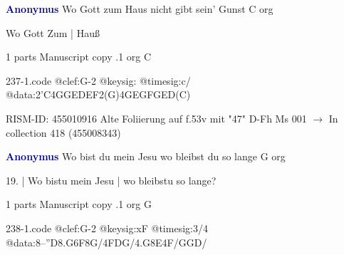 \documentclass[twocolumn]{book}
\begin{document}
\newline \par \vspace{7pt} \textcolor{darkblue}{\textbf{Anonymus  }}
\newline Wo Gott zum Haus nicht gibt sein' Gunst  C  
\newline org
\newline \begin{itshape}[f.53v, at left:] Wo Gott Zum | Hauß\end{itshape} 
\newline \textcolor{darkblue}{}  1 parts  
\newline Manuscript copy
.1  org  C  
\begin{filecontents*}{237-1.code}
@clef:G-2
@keysig:
@timesig:c/
@data:2'C4GGEDEF2(G)4GEGFGED(C)
\end{filecontents*}
\newline
%

\newline RISM-ID: 455010916
\newline Alte Foliierung auf f.53v mit "47"
\newline D-Fh  Ms 001
\newline $\rightarrow$ In collection 418 (455008343)

\newline \par \vspace{7pt} \textcolor{darkblue}{\textbf{Anonymus  }}
\newline Wo bist du mein Jesu wo bleibst du so lange  G  
\newline org
\newline \begin{itshape}[f.12v, at left:] 19. | Wo bistu mein Jesu | wo bleibstu so lange?\end{itshape} 
\newline \textcolor{darkblue}{}  1 parts  
\newline Manuscript copy
.1  org  G  
\begin{filecontents*}{238-1.code}
@clef:G-2
@keysig:xF
@timesig:3/4
@data:8--''D{8.G6F8G}/4FDG/4.G8E4F/GGD/
\end{filecontents*}
\newline
%
\end{document}
